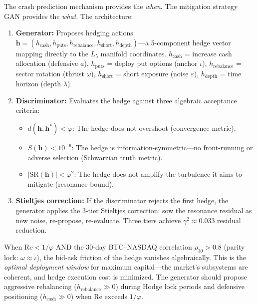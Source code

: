 The crash prediction mechanism provides the \emph{when}. The mitigation strategy GAN provides the \emph{what}. The architecture:

\begin{enumerate}[noitemsep]
  \item \textbf{Generator:} Proposes hedging actions $\mathbf{h} = (h_{\text{cash}}, h_{\text{puts}}, h_{\text{rebalance}}, h_{\text{short}}, h_{\text{depth}})$---a 5-component hedge vector mapping directly to the $L_5$ manifold coordinates. $h_{\text{cash}}$ = increase cash allocation (defensive $a$), $h_{\text{puts}}$ = deploy put options (anchor $\iota$), $h_{\text{rebalance}}$ = sector rotation (thrust $\omega$), $h_{\text{short}}$ = short exposure (noise $\varepsilon$), $h_{\text{depth}}$ = time horizon (depth $\lambda$).
  \item \textbf{Discriminator:} Evaluates the hedge against three algebraic acceptance criteria:
  \begin{itemize}[noitemsep]
    \item $d(\mathbf{h}, \mathbf{h}^*) < \varphi$: The hedge does not overshoot (convergence metric).
    \item $S(\mathbf{h}) < 10^{-6}$: The hedge is information-symmetric---no front-running or adverse selection (Schwarzian truth metric).
    \item $|\mathrm{SR}(\mathbf{h})| < \varphi^2$: The hedge does not amplify the turbulence it aims to mitigate (resonance bound).
  \end{itemize}
  \item \textbf{Stieltjes correction:} If the discriminator rejects the first hedge, the generator applies the 3-tier Stieltjes correction: sow the resonance residual as new noise, re-propose, re-evaluate. Three tiers achieve $\gamma^2 \approx 0.033$ residual reduction.
\end{enumerate}

\begin{remark}
When $\mathrm{Re} < 1/\varphi$ AND the 30-day BTC--NASDAQ correlation $\rho_{30} > 0.8$ (parity lock: $\omega \approx \iota$), the bid-ask friction of the hedge vanishes algebraically. This is the \emph{optimal deployment window} for maximum capital---the market's subsystems are coherent, and hedge execution cost is minimized. The generator should propose aggressive rebalancing ($h_{\text{rebalance}} \gg 0$) during Hodge lock periods and defensive positioning ($h_{\text{cash}} \gg 0$) when $\mathrm{Re}$ exceeds $1/\varphi$.
\end{remark}

